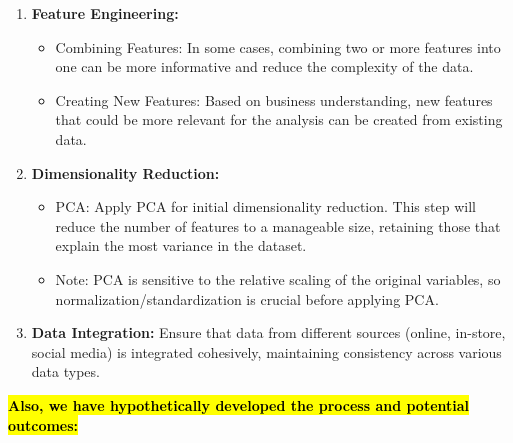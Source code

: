 \documentclass{article}
\begin{document}
\begin{enumerate}
    \item \textbf{Feature Engineering:}
    \begin{itemize}
        \item Combining Features: In some cases, combining two or more features into one can be more informative and reduce the complexity of the data.
        \item Creating New Features: Based on business understanding, new features that could be more relevant for the analysis can be created from existing data.
    \end{itemize}
    
    \item \textbf{Dimensionality Reduction:}
    \begin{itemize}
        \item PCA: Apply PCA for initial dimensionality reduction. This step will reduce the number of features to a manageable size, retaining those that explain the most variance in the dataset.
        \item Note: PCA is sensitive to the relative scaling of the original variables, so normalization/standardization is crucial before applying PCA.
    \end{itemize}
    
    \item \textbf{Data Integration:}
    Ensure that data from different sources (online, in-store, social media) is integrated cohesively, maintaining consistency across various data types.
\end{enumerate}
\textbf{\hl{Also, we have hypothetically developed the process and potential outcomes:}}
\end{document}
